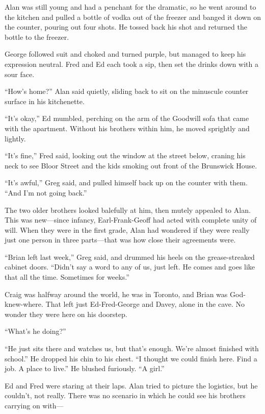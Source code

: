 Alan was still young and had a penchant for the dramatic, so he went
around to the kitchen and pulled a bottle of vodka out of the freezer
and banged it down on the counter, pouring out four shots.  He tossed
back his shot and returned the bottle to the freezer.

George followed suit and choked and turned purple, but managed to keep
his expression neutral.  Fred and Ed each took a sip, then set the
drinks down with a sour face.

``How's home?'' Alan said quietly, sliding back to sit on the
minuscule counter surface in his kitchenette.

``It's okay,'' Ed mumbled, perching on the arm of the Goodwill sofa
that came with the apartment.  Without his brothers within him, he
moved sprightly and lightly.

``It's fine,'' Fred said, looking out the window at the street below,
craning his neck to see Bloor Street and the kids smoking out front of
the Brunswick House.

``It's awful,'' Greg said, and pulled himself back up on the counter
with them.  ``And I'm not going back.''

The two older brothers looked balefully at him, then mutely appealed
to Alan.  This was new---since infancy, Earl-Frank-Geoff had acted
with complete unity of will.  When they were in the first grade, Alan
had wondered if they were really just one person in three parts---that
was how close their agreements were.

``Brian left last week,'' Greg said, and drummed his heels on the
grease-streaked cabinet doors.  ``Didn't say a word to any of us, just
left.  He comes and goes like that all the time.  Sometimes for
weeks.''

Craig was halfway around the world, he was in Toronto, and Brian was
God-knew-where.  That left just Ed-Fred-George and Davey, alone in the
cave.  No wonder they were here on his doorstep.

``What's he doing?''

``He just sits there and watches us, but that's enough.  We're almost
finished with school.'' He dropped his chin to his chest.  ``I thought
we could finish here.  Find a job.  A place to live.'' He blushed
furiously.  ``A girl.''

Ed and Fred were staring at their laps.  Alan tried to picture the
logistics, but he couldn't, not really.  There was no scenario in
which he could see his brothers carrying on with---

